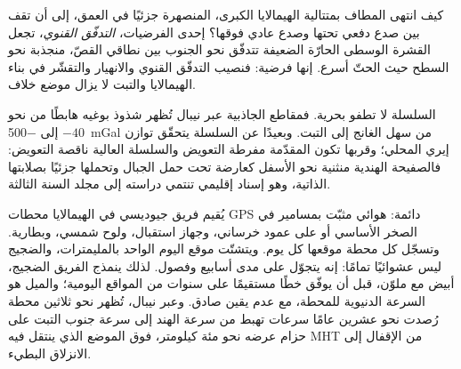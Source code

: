 \begin{omfigure}
\par{}
\end{omfigure}

كيف انتهى المطاف بمتتالية الهيمالايا الكبرى، المنصهرة جزئيًا في العمق، إلى أن تقف بين
صدع دفعي تحتها وصدع عادي فوقها؟ إحدى الفرضيات، \emph{التدفّق القنوي}، تجعل القشرة الوسطى
الحارّة الضعيفة تتدفّق نحو الجنوب بين نطاقي القصّ، منجذبة نحو
السطح حيث الحتّ أسرع. إنها فرضية: فنصيب التدفّق القنوي والانهيار
والتقشّر في بناء الهيمالايا والتبت لا يزال موضع خلاف.

السلسلة لا تطفو بحرية. فمقاطع الجاذبية عبر نيبال تُظهر شذوذ بوغيه
هابطًا من نحو $-40$ إلى \qty{-500}{mGal} من سهل الغانج إلى التبت. وبعيدًا عن
السلسلة يتحقّق توازن إيري المحلي؛ وقربها تكون المقدّمة مفرطة التعويض والسلسلة
العالية ناقصة التعويض: فالصفيحة الهندية منثنية نحو الأسفل كعارضة تحت حمل
الجبال وتحملها جزئيًا بصلابتها الذاتية، وهو إسناد إقليمي تنتمي دراسته
إلى مجلد السنة الثالثة.

\begin{inthefield}
يُقيم فريق جيوديسي في الهيمالايا محطات GPS دائمة: هوائي مثبّت بمسامير في الصخر الأساسي
أو على عمود خرساني، وجهاز استقبال، ولوح شمسي، وبطارية. وتسجّل كل محطة
موقعها كل يوم. ويتشتّت موقع اليوم الواحد بالمليمترات، والضجيج ليس عشوائيًا
تمامًا: إنه يتجوّل على مدى أسابيع وفصول. لذلك ينمذج الفريق الضجيج، أبيض مع
ملوّن، قبل أن يوفّق خطًا مستقيمًا على سنوات من المواقع اليومية؛ والميل هو
السرعة الدنيوية للمحطة، مع عدم يقين صادق. وعبر نيبال، تُظهر نحو ثلاثين محطة
رُصدت نحو عشرين عامًا سرعات تهبط من سرعة الهند إلى سرعة جنوب التبت
على حزام عرضه نحو مئة كيلومتر، فوق الموضع الذي ينتقل فيه MHT من الإقفال
إلى الانزلاق البطيء.
\end{inthefield}

